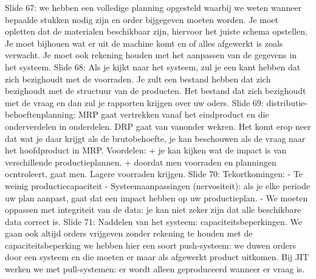 \documentclass[10pt,a4paper]{report}
\begin{document}

















Slide 67: we hebben een volledige planning opgesteld waarbij we weten wanneer bepaalde stukken nodig zijn en order bijgegeven moeten worden. Je moet opletten dat de materialen beschikbaar zijn, hiervoor het juiste schema opstellen. Je moet bijhouen wat er uit de machine komt en of alles afgewerkt is zoals verwacht. Je moet ook rekening houden met het aanpassen van de gegevens in het systeem.
Slide 68: Als je kijkt naar het systeem, zul je een kant hebben dat zich bezighoudt met de voorraden. Je zult een bestand hebben dat zich bezighoudt met de structuur van de producten. Het bestand dat zich bezighoudt met de vraag en dan zul je rapporten krijgen over uw oders.
Slide 69: distributie-behoeftenplanning: MRP gaat vertrekken vanaf het eindproduct en die onderverdelen in onderdelen. DRP gaat van vanonder wekren. Het komt erop neer dat wat je daar krijgt als de brutobehoefte, je kan beschouwen als de vraag naar het hoofdproduct in MRP.
Voordelen:
+ je kan kijken wat de impact is van verschillende productieplannen.
+ doordat men voorraden en planningen ocntroleert, gaat men. Lagere voorraden krijgen.
Slide 70: Tekortkomingen:
	- Te weinig productiecapaciteit
	- Systeemaanpassingen (nervositeit): als je elke periode uw plan aanpast, gaat dat een impact hebben op uw productieplan. 
	- We moeten oppassen met integriteit van de data: je kan niet zeker zijn dat alle beschikbare data correct is.
Slide 71: Naddelen van het systeem: capaciteitsbeperkingen. We gaan ook altijd orders vrijgeven zonder rekening te houden met de capaciteitsbeperking we hebben hier een soort push-systeem: we duwen orders door een systeem en die moeten er maar als afgewerkt product uitkomen. Bij JIT werken we met pull-systemen: er wordt alleen geproduceerd wanneer er vraag is. 
\end{document}
